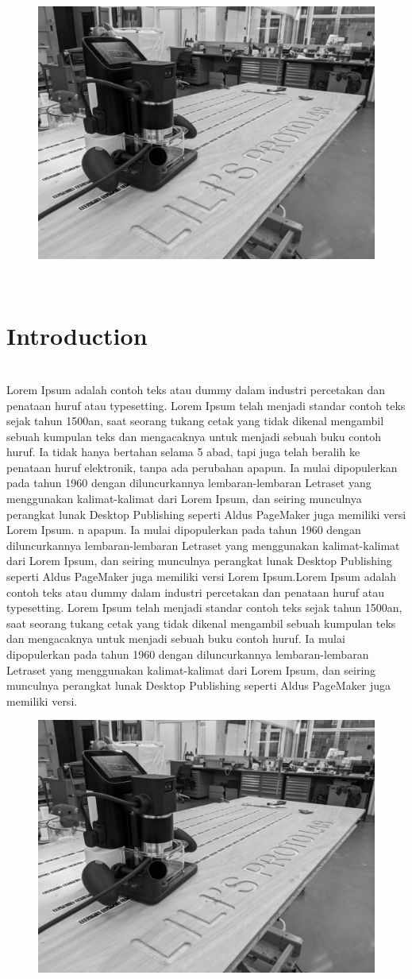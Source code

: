 \documentclass{report}
\newcommand\pagetitle{SectionTitle}
\newcommand{\LPLsection}[1]{%
\begin{figure}%
    \centering%
    \includegraphics[height=\textheight]{design_images/LPL_shaper.jpg}%
\end{figure}%
\clearpage%
\,\vspace{\textheight/3}%
\renewcommand\pagetitle{#1}%
\section*{\centering \pagetitle}%
\addcontentsline{toc}{section}{\protect\numberline{}\pagetitle}%
\clearpage%
}
\begin{document}
\LPLsection{Introduction}

 \\

Lorem Ipsum adalah contoh teks atau dummy dalam industri percetakan dan penataan huruf atau typesetting. Lorem Ipsum telah menjadi standar contoh teks sejak tahun 1500an, saat seorang tukang cetak yang tidak dikenal mengambil sebuah kumpulan teks dan mengacaknya untuk menjadi sebuah buku contoh huruf. Ia tidak hanya bertahan selama 5 abad, tapi juga telah beralih ke penataan huruf elektronik, tanpa ada perubahan apapun. Ia mulai dipopulerkan pada tahun 1960 dengan diluncurkannya lembaran-lembaran Letraset yang menggunakan kalimat-kalimat dari Lorem Ipsum, dan seiring munculnya perangkat lunak Desktop Publishing seperti Aldus PageMaker juga memiliki versi Lorem Ipsum.
n apapun. Ia mulai dipopulerkan pada tahun 1960 dengan diluncurkannya lembaran-lembaran Letraset yang menggunakan kalimat-kalimat dari Lorem Ipsum, dan seiring munculnya perangkat lunak Desktop Publishing seperti Aldus PageMaker juga memiliki versi Lorem Ipsum.Lorem Ipsum adalah contoh teks atau dummy dalam industri percetakan dan penataan huruf atau typesetting. Lorem Ipsum telah menjadi standar contoh teks sejak tahun 1500an, saat seorang tukang cetak yang tidak dikenal mengambil sebuah kumpulan teks dan mengacaknya untuk menjadi sebuah buku contoh huruf.
Ia mulai dipopulerkan pada tahun 1960 dengan diluncurkannya lembaran-lembaran Letraset yang menggunakan kalimat-kalimat dari Lorem Ipsum, dan seiring munculnya perangkat lunak Desktop Publishing seperti Aldus PageMaker juga memiliki versi. 

\clearpage

\begin{figure}
    \centering
    \includegraphics[height=\textheight]{design_images/LPL_shaper.jpg}
\end{figure}
\clearpage
\,\vspace{\textheight/3}
\renewcommand\pagetitle{Overview}   %
\end{document}
